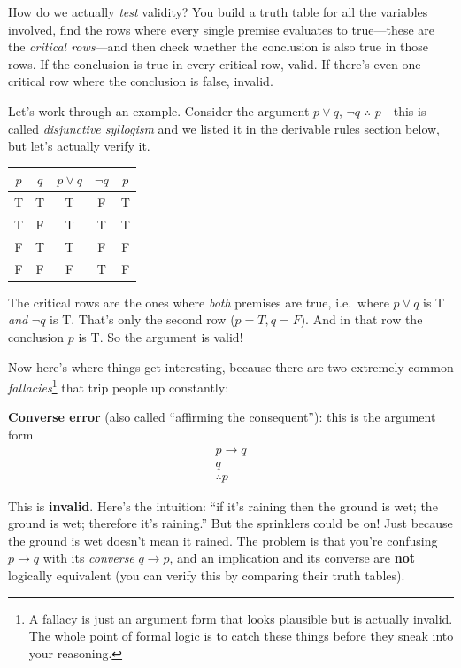 \documentclass[11pt]{article}
\begin{document}
How do we actually \emph{test} validity? You build a truth table for all the variables involved, find the rows where every single premise evaluates to true---these are the \emph{critical rows}---and then check whether the conclusion is also true in those rows. If the conclusion is true in every critical row, valid. If there's even one critical row where the conclusion is false, invalid.

Let's work through an example. Consider the argument $p \vee q$, $\lnot q$ $\therefore$ $p$---this is called \emph{disjunctive syllogism} and we listed it in the derivable rules section below, but let's actually verify it.

\begin{center}
\begin{tabular}{ccccc}
\toprule
$p$ & $q$ & $p \vee q$ & $\lnot q$ & $p$ \\
\midrule
T & T & T & F & T \\
T & F & T & T & T \\
F & T & T & F & F \\
F & F & F & T & F \\
\bottomrule
\end{tabular}
\end{center}

The critical rows are the ones where \emph{both} premises are true, i.e.\ where $p \vee q$ is T \emph{and} $\lnot q$ is T. That's only the second row ($p = T, q = F$). And in that row the conclusion $p$ is T. So the argument is valid!

Now here's where things get interesting, because there are two extremely common \emph{fallacies}\footnote{A fallacy is just an argument form that looks plausible but is actually invalid. The whole point of formal logic is to catch these things before they sneak into your reasoning.} that trip people up constantly:

\textbf{Converse error} (also called ``affirming the consequent''): this is the argument form
\[
  \begin{array}{c}
    p \to q \\
    q \\
    \hline
    \therefore p
  \end{array}
\]

This is \textbf{invalid}. Here's the intuition: ``if it's raining then the ground is wet; the ground is wet; therefore it's raining.'' But the sprinklers could be on! Just because the ground is wet doesn't mean it rained. The problem is that you're confusing $p \to q$ with its \emph{converse} $q \to p$, and an implication and its converse are \textbf{not} logically equivalent (you can verify this by comparing their truth tables).
\end{document}
